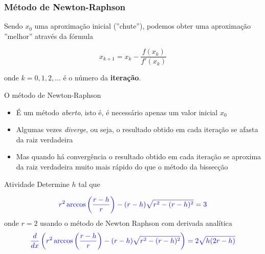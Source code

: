 \begin{frame}
    \frametitle{Método de Newton-Raphson}

    Sendo \(x_0\) uma aproximação inicial (''chute''), podemos obter uma aproximação ''melhor'' através da fórmula
    \begin{block}
        {}
        \[ x_{k+1} = x_k - \frac{f(x_k)}{f'(x_k)} \]
    \end{block}
    onde \(k=0,1,2,\ldots\) é o número da \textbf{iteração}. 

    O método de Newton-Raphson
    \begin{itemize}
        \item É um método \textit{aberto}, isto é, é necessário apenas um valor inicial \(x_0\)
        \item Algumas vezes \textit{diverge}, ou seja, o resultado obtido em cada iteração se afasta da raiz verdadeira
        \item Mas quando há convergência o resultado obtido em cada iteração se aproxima da raiz verdadeira muito mais rápido do que o método da bissecção
    \end{itemize}
\end{frame}

\begin{frame}{Atividade}
    Determine \(h\) tal que

    \[
        \color{blue}
        r^2 \arccos{\left(\frac{r-h}{r}\right)}-(r-h)\sqrt{r^2-(r-h)^2}=3
    \]
    onde \(r=2\) usando o método de Newton Raphson com derivada analítica
    \[
        \color{blue}
        \frac{d}{dx} \left( 
            r^2 \arccos{\left(\frac{r-h}{r}\right)}-(r-h)\sqrt{r^2-(r-h)^2}
        \right)=
        2\sqrt{h(2r-h)}
    \]
\end{frame}


